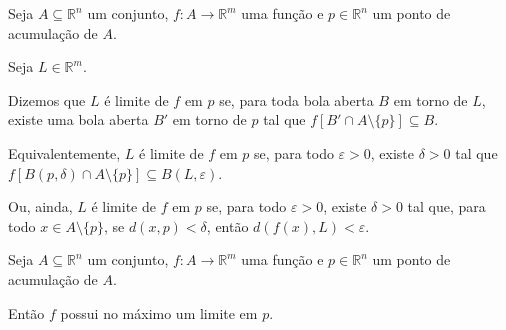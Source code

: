 \begin{definition}
    Seja $A\subseteq \mathbb R^n$ um conjunto, $f: A \to \mathbb R^m$ uma função e $p \in \mathbb R^n$ um ponto de acumulação de $A$.

    Seja $L \in \mathbb R^m$.

    Dizemos que $L$ é limite de $f$ em $p$ se, para toda bola aberta $B$ em torno de $L$, existe uma bola aberta $B'$ em torno de $p$ tal que $f[B'\cap A\setminus\{p\}]\subseteq B$.

    Equivalentemente, $L$ é limite de $f$ em $p$ se, para todo $\varepsilon > 0$, existe $\delta > 0$ tal que $f[B(p, \delta)\cap A\setminus\{p\}]\subseteq B(L, \varepsilon)$.

        Ou, ainda, $L$ é limite de $f$ em $p$ se, para todo $\varepsilon > 0$, existe $\delta > 0$ tal que, para todo $x \in A\setminus\{p\}$, se $d(x, p) < \delta$, então $d(f(x), L) < \varepsilon$.
\end{definition}

\begin{proposition}
    Seja $A\subseteq \mathbb R^n$ um conjunto, $f: A \to \mathbb R^m$ uma função e $p \in \mathbb R^n$ um ponto de acumulação de $A$.

    Então $f$ possui no máximo um limite em $p$.
\end{proposition}

